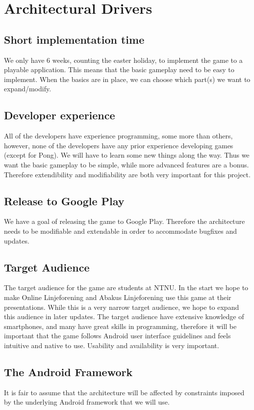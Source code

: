 \section{Architectural Drivers} 
\label{sec:architecturaldrivers}

\subsection{Short implementation time}
We only have 6 weeks, counting the easter holiday, to implement the game to a playable application. This means that the basic gameplay need to be easy to implement. When the basics are in place, we can choose which part(s) we want to expand/modify.

\subsection{Developer experience}
All of the developers have experience programming, some more than others, however, none of the developers have any prior experience developing games (except for Pong). We will have to learn some new things along the way. Thus we want the basic gameplay to be simple, while more advanced features are a bonus. Therefore extendibility and modifiability are both very important for this project.

\subsection{Release to Google Play}
We have a goal of releasing the game to Google Play. Therefore the architecture needs to be modifiable and extendable in order to accommodate bugfixes and updates. 

\subsection{Target Audience}
The target audience for the game are students at NTNU. In the start we hope to make Online Linjeforening and Abakus Linjeforening use this game at their presentations. While this is a very narrow target audience, we hope to expand this audience in later updates. The target audience have extensive knowledge of smartphones, and many have great skills in programming, therefore it will be important that the game follows Android user interface guidelines and feels intuitive and native to use. Usability and availability is very important.

\subsection{The Android Framework}
It is fair to assume that the architecture will be affected by constraints imposed by the underlying Android framework that we will use.
